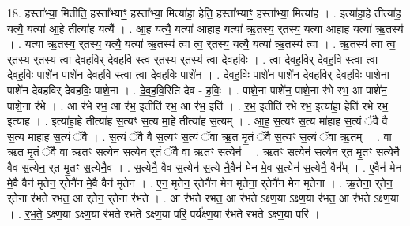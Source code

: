 \documentclass[17pt]{extarticle}
\begin{document}
18. हस्ता᳚भ्या॒ मितीति॒ हस्ता᳚भ्याꣳ॒॒ हस्ता᳚भ्या॒ मित्या॑हा॒ हेति॒ हस्ता᳚भ्याꣳ॒॒ हस्ता᳚भ्या॒ मित्या॑ह । . इत्या॑हा॒हे तीत्या॑ह॒ यत्यै॒ यत्या॑ आ॒हे तीत्या॑ह॒ यत्यै᳚ । . आ॒ह॒ यत्यै॒ यत्या॑ आहाह॒ यत्या॑ ऋ॒तस्य॒ र्‌तस्य॒ यत्या॑ आहाह॒ यत्या॑ ऋ॒तस्य॑ । . यत्या॑ ऋ॒तस्य॒ र्‌तस्य॒ यत्यै॒ यत्या॑ ऋ॒तस्य॑ त्वा त्व॒ र्‌तस्य॒ यत्यै॒ यत्या॑ ऋ॒तस्य॑ त्वा । . ऋ॒तस्य॑ त्वा त्व॒ र्‌तस्य॒ र्‌तस्य॑ त्वा देवहविर् देवहवि स्त्व॒ र्‌तस्य॒ र्‌तस्य॑ त्वा देवहविः । . त्वा॒ दे॒व॒ह॒वि॒र् दे॒व॒ह॒वि॒ स्त्वा॒ त्वा॒ दे॒व॒ह॒विः॒ पाशे॑न॒ पाशे॑न देवहवि स्त्वा त्वा देवहविः॒ पाशे॑न । . दे॒व॒ह॒विः॒ पाशे॑न॒ पाशे॑न देवहविर् देवहविः॒ पाशे॒ना पाशे॑न देवहविर् देवहविः॒ पाशे॒ना । . दे॒व॒ह॒वि॒रिति॑ देव - ह॒विः॒ । . पाशे॒ना पाशे॑न॒ पाशे॒ना र॑भे रभ॒ आ पाशे॑न॒ पाशे॒ना र॑भे । . आ र॑भे रभ॒ आ र॑भ॒ इतीति॑ रभ॒ आ र॑भ॒ इति॑ । . र॒भ॒ इतीति॑ रभे रभ॒ इत्या॑हा॒ हेति॑ रभे रभ॒ इत्या॑ह । . इत्या॑हा॒हे तीत्या॑ह स॒त्यꣳ स॒त्य मा॒हे तीत्या॑ह स॒त्यम् । . आ॒ह॒ स॒त्यꣳ स॒त्य मा॑हाह स॒त्यं ॅवै वै स॒त्य मा॑हाह स॒त्यं ॅवै । . स॒त्यं ॅवै वै स॒त्यꣳ स॒त्यं ॅवा ऋ॒त मृ॒तं ॅवै स॒त्यꣳ स॒त्यं ॅवा ऋ॒तम् । . वा ऋ॒त मृ॒तं ॅवै वा ऋ॒तꣳ स॒त्येन॑ स॒त्येन॒ र्‌‍तं ॅवै वा ऋ॒तꣳ स॒त्येन॑ । . ऋ॒तꣳ स॒त्येन॑ स॒त्येन॒ र्‌त मृ॒तꣳ स॒त्येनै॒ वैव स॒त्येन॒ र्‌त मृ॒तꣳ स॒त्येनै॒व । . स॒त्येनै॒ वैव स॒त्येन॑ स॒त्ये नै॒वैन॑ मेन मे॒व स॒त्येन॑ स॒त्येनै॒ वैन᳚म् । . ए॒वैन॑ मेन मे॒वै वैन॑ मृ॒तेन॒ र्‌तेनै॑न मे॒वै वैन॑ मृ॒तेन॑ । . ए॒न॒ मृ॒तेन॒ र्‌तेनै॑न मेन मृ॒तेना॒ र्‌तेनै॑न मेन मृ॒तेना । . ऋ॒तेना॒ र्‌तेन॒ र्‌तेना र॑भते रभत॒ आ र्‌तेन॒ र्‌तेना र॑भते । . आ र॑भते रभत॒ आ र॑भते ऽक्ष्ण॒या ऽक्ष्ण॒या र॑भत॒ आ र॑भते ऽक्ष्ण॒या । . र॒भ॒ते॒ ऽक्ष्ण॒या ऽक्ष्ण॒या र॑भते रभते ऽक्ष्ण॒या परि॒ पर्य॑क्ष्ण॒या र॑भते रभते ऽक्ष्ण॒या परि॑ । \newline
\end{document}
